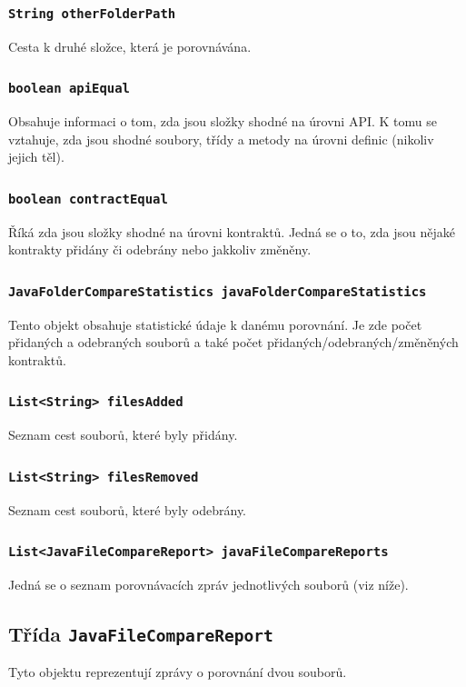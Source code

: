 			\subsubsection{\texttt{String otherFolderPath}}
				Cesta k druhé složce, která je porovnávána.
				
			\subsubsection{\texttt{boolean apiEqual}}
				Obsahuje informaci o tom, zda jsou složky shodné na úrovni API. K tomu se vztahuje, zda jsou shodné soubory, třídy a metody na úrovni definic (nikoliv jejich těl).
				
			\subsubsection{\texttt{boolean contractEqual}}
				Říká zda jsou složky shodné na úrovni kontraktů. Jedná se o to, zda jsou nějaké kontrakty přidány či odebrány nebo jakkoliv změněny.
				
			\subsubsection{\texttt{JavaFolderCompareStatistics javaFolderCompareStatistics}}
				Tento objekt obsahuje statistické údaje k danému porovnání. Je zde počet přidaných a odebraných souborů a také počet přidaných/odebraných/změněných kontraktů. 
			
			\subsubsection{\texttt{List<String> filesAdded}}
				Seznam cest souborů, které byly přidány.
				
			\subsubsection{\texttt{List<String> filesRemoved}}
				Seznam cest souborů, které byly odebrány.
				
			\subsubsection{\texttt{List<JavaFileCompareReport> javaFileCompareReports}}
				Jedná se o seznam porovnávacích zpráv jednotlivých souborů (viz níže). 
				
				
		\subsection{Třída \texttt{JavaFileCompareReport}}
			Tyto objektu reprezentují zprávy o porovnání dvou souborů.
			
